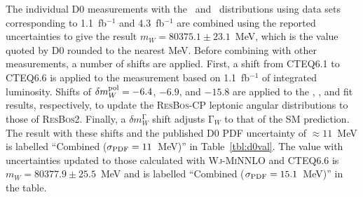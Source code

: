 The individual D0 measurements with the \mT~and \pTl~distributions using data sets corresponding 
to 1.1~fb$^{-1}$ and 4.3~fb$^{-1}$ are combined using the reported uncertainties to give the result 
$m_W = 80375.1 \pm 23.1$~MeV, which is the value quoted by D0 rounded to the nearest MeV.  Before 
combining with other measurements, a number of shifts are applied.  First, a shift from CTEQ6.1 to
CTEQ6.6 is applied to the measurement based on 1.1~fb$^{-1}$ of integrated luminosity.  Shifts of 
$\delta m_W^{\scriptsize\textrm{pol}} = -6.4$, $-6.9$, and $-15.8$ are applied to the \mT, \pTl,
and \met fit results, respectively, to update the {\textsc{ResBos-CP}} leptonic angular distributions to
those of {\textsc{ResBos2}}.  Finally, a $\delta m_W^{\mathrm\Gamma}$ shift adjusts ${\mathrm\Gamma_W}$
to that of the SM prediction.  The result with these shifts and the published D0 PDF uncertainty
of $\approx 11$~MeV is labelled ``Combined ($\sigma_{\scriptsize\textrm{PDF}} = 11$~MeV)'' in
Table~\ref{tbl:d0val}.  The value with uncertainties updated to those calculated with {\textsc{Wj-MiNNLO}}
and CTEQ6.6 is $m_W = 80377.9 \pm 25.5$~MeV and is labelled ``Combined ($\sigma_{\scriptsize\textrm{PDF}} = 15.1$~MeV)''
in the table.

